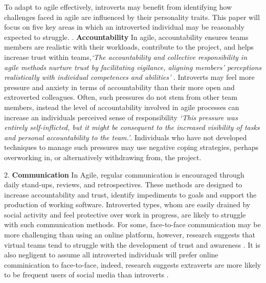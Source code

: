 \documentclass{scrartcl}
\begin{document}
To adapt to agile effectively, introverts may benefit from identifying how challenges faced in agile are influenced by their personality traits. This paper will focus on five key areas in which an introverted individual may be reasonably expected to struggle. 
\newline
{}.	\textbf{Accountability} \newline
In agile, accountability ensures teams members are realistic with their workloads, contribute to the project, and helps increase trust within teams,\textit{`The accountability and collective responsibility in agile methods nurture trust by facilitating vigilance, aligning members' perceptions realistically with individual competences and abilities'} \cite[p. 73]{McHughConboyLang}. Introverts may feel more pressure and anxiety in terms of accountability than their more open and extroverted colleagues. Often, such pressures do not stem from other team members, instead the level of accountability involved in agile processes can increase an individuals perceived sense of responsibility \textit{`This pressure was entirely self-inflicted, but it might be consequent to the increased visibility of tasks and personal accountability to the team.'}\cite[p. 74]{McHughConboyLang}. Individuals who have not developed techniques to manage such pressures may use negative coping strategies, perhaps overworking in, or alternatively withdrawing from, the project.

2.	\textbf{Communication} \newline
In Agile, regular communication is encouraged through daily stand-ups, reviews, and retrospectives.  These methods are designed to increase accountability and trust, identify impediments to goals and support the production of working software. Introverted types, whom are easily drained by social activity and feel protective over work in progress, are likely to struggle with such communication methods. For some, face-to-face communication may be more challenging than using an online platform, however, research suggests that virtual teams tend to struggle with the development of trust and awareness \cite{Rutz}. It is also negligent to assume all introverted individuals will prefer online comminication to face-to-face, indeed, research suggests extraverts are more likely to be frequent users of social media than introverts \cite{Correa}.
\end{document}
